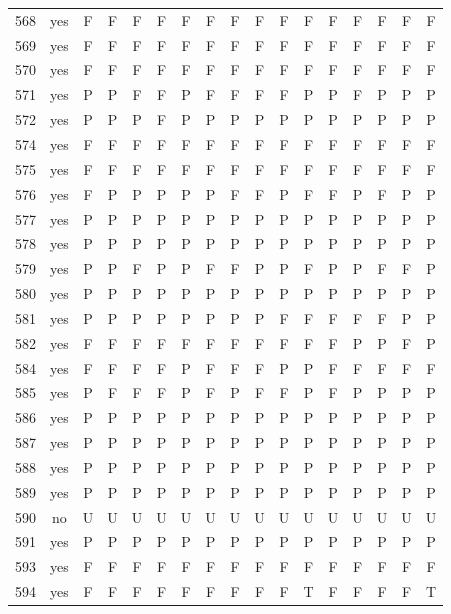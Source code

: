 \begin{table}[p]
\begin{tabular*}{\textwidth}{@{\extracolsep{\fill}}rcccccccccccccccc}
568 & yes & F & F & F & F & F & F & F & F & F & F & F & F & F & F & F\\
569 & yes & F & F & F & F & F & F & F & F & F & F & F & F & F & F & F\\
570 & yes & F & F & F & F & F & F & F & F & F & F & F & F & F & F & F\\
571 & yes & P & P & F & F & P & F & F & F & F & P & P & F & P & P & P\\
572 & yes & P & P & P & F & P & P & P & P & P & P & P & P & P & P & P\\
574 & yes & F & F & F & F & F & F & F & F & F & F & F & F & F & F & F\\
575 & yes & F & F & F & F & F & F & F & F & F & F & F & F & F & F & F\\
576 & yes & F & P & P & P & P & P & F & F & P & F & F & P & F & P & P\\
577 & yes & P & P & P & P & P & P & P & P & P & P & P & P & P & P & P\\
578 & yes & P & P & P & P & P & P & P & P & P & P & P & P & P & P & P\\
579 & yes & P & P & F & P & P & F & F & P & P & F & P & P & F & F & P\\
580 & yes & P & P & P & P & P & P & P & P & P & P & P & P & P & P & P\\
581 & yes & P & P & P & P & P & P & P & P & F & F & F & F & F & P & P\\
582 & yes & F & F & F & F & F & F & F & F & F & F & F & P & P & F & P\\
584 & yes & F & F & F & F & P & F & F & F & P & P & F & F & F & F & F\\
585 & yes & P & F & F & F & P & F & P & F & F & P & F & P & P & P & P\\
586 & yes & P & P & P & P & P & P & P & P & P & P & P & P & P & P & P\\
587 & yes & P & P & P & P & P & P & P & P & P & P & P & P & P & P & P\\
588 & yes & P & P & P & P & P & P & P & P & P & P & P & P & P & P & P\\
589 & yes & P & P & P & P & P & P & P & P & P & P & P & P & P & P & P\\
590 & no & U & U & U & U & U & U & U & U & U & U & U & U & U & U & U\\
591 & yes & P & P & P & P & P & P & P & P & P & P & P & P & P & P & P\\
593 & yes & F & F & F & F & F & F & F & F & F & F & F & F & F & F & F\\
594 & yes & F & F & F & F & F & F & F & F & F & T & F & F & F & F & T\\
\bottomrule\end{tabular*}\end{table}
\clearpage

